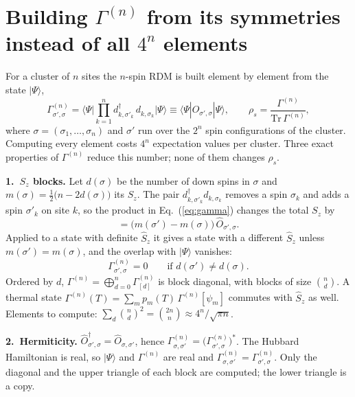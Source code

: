\documentclass[11pt]{article}
\newcommand{\rdm}{\Gamma^{(n)}}
\begin{document}
\sloppy

\section*{Building $\rdm$ from its symmetries instead of all $4^n$ elements}

For a cluster of $n$ sites the $n$-spin RDM is built element by element from the state $|\Psi\rangle$,
\begin{equation}
  \rdm_{\sigma',\sigma}=\Big\langle\Psi\Big|\prod_{k=1}^{n}d^{\dagger}_{k,\sigma'_k}\,d^{\phantom\dagger}_{k,\sigma_k}\Big|\Psi\Big\rangle
  \equiv\langle\Psi|\hat O_{\sigma',\sigma}|\Psi\rangle ,
  \qquad \rho_s=\frac{\rdm}{\mathrm{Tr}\,\rdm},
  \label{eq:gamma}
\end{equation}
where $\sigma=(\sigma_1,\dots,\sigma_n)$ and $\sigma'$ run over the $2^n$ spin configurations of the
cluster. Computing every element costs $4^n$ expectation values per cluster. Three exact properties of
$\rdm$ reduce this number; none of them changes $\rho_s$.

\textbf{1.\ $S_z$ blocks.} Let $d(\sigma)$ be the number of down spins in $\sigma$ and $m(\sigma)=\tfrac12\big(n-2d(\sigma)\big)$
its $S_z$. The pair $d^\dagger_{k,\sigma'_k}d_{k,\sigma_k}$ removes a spin $\sigma_k$ and adds a spin
$\sigma'_k$ on site $k$, so the product in Eq.~(\ref{eq:gamma}) changes the total $S_z$ by
\begin{equation}
  [\hat S_z,\hat O_{\sigma',\sigma}]=\big(m(\sigma')-m(\sigma)\big)\,\hat O_{\sigma',\sigma}.
\end{equation}
Applied to a state with definite $\hat S_z$ it gives a state with a different $\hat S_z$ unless
$m(\sigma')=m(\sigma)$, and the overlap with $|\Psi\rangle$ vanishes:
\begin{equation}
  \rdm_{\sigma',\sigma}=0\qquad\text{if } d(\sigma')\neq d(\sigma).
  \label{eq:sz}
\end{equation}
Ordered by $d$, $\rdm=\bigoplus_{d=0}^{n}\rdm_{[d]}$ is block diagonal, with blocks of size
$\binom{n}{d}$. A thermal state $\rdm(T)=\sum_m p_m(T)\,\rdm[\psi_m]$ commutes with $\hat S_z$ as
well. Elements to compute: $\sum_d\binom{n}{d}^2=\binom{2n}{n}\approx 4^n/\sqrt{\pi n}$.

\textbf{2.\ Hermiticity.} $\hat O_{\sigma',\sigma}^\dagger=\hat O_{\sigma,\sigma'}$, hence $\rdm_{\sigma,\sigma'}=\big(\rdm_{\sigma',\sigma}\big)^{*}$. The
Hubbard Hamiltonian is real, so $|\Psi\rangle$ and $\rdm$ are real and $\rdm_{\sigma,\sigma'}=\rdm_{\sigma',\sigma}$.
Only the diagonal and the upper triangle of each block are computed; the lower triangle is a copy.
\end{document}
